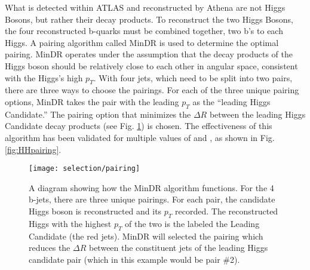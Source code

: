         What is detected within ATLAS and reconstructed by Athena are not Higgs Bosons, but rather their decay products.
        To reconstruct the two Higgs Bosons, the four reconstructed b-quarks must be combined together, two b's to each Higgs.
        A pairing algorithm called MinDR\cite{hh4b_2021_int_note}
            is used to determine the optimal pairing.
        MinDR operates under the assumption that the decay products of the Higgs boson
            should be relatively close to each other in angular space, consistent with the Higgs's high $p_T$.
        With four jets, which need to be split into two pairs, there are three ways to choose the pairings.
        For each of the three unique pairing options, MinDR takes the pair with the leading $p_T$ as the ``leading Higgs Candidate.''
        The pairing option that minimizes the $\Delta R$ between the leading Higgs Candidate decay products
            (see Fig. \ref{fig:minDR_pairing_diagram}) is chosen.
        The effectiveness of this algorithm has been validated for multiple values of \kvv and \kl,
            as shown in Fig. \ref{fig:HHpairing}.

        \begin{figure}[tbh]
            \texttt{[image: selection/pairing]}
            \caption{
                A diagram showing how the MinDR algorithm functions.
                For the 4 b-jets, there are three unique pairings.
                For each pair, the candidate Higgs boson is reconstructed and its $p_T$ recorded.
                The reconstructed Higgs with the highest $p_T$ of the two is the labeled the Leading Candidate
                    (the red jets).
                MinDR will selected the pairing which reduces the $\Delta R$ between the constituent jets
                    of the leading Higgs candidate pair (which in this example would be pair \#2)\cite{hh4b_2021_int_note}.
            }
            \label{fig:minDR_pairing_diagram}
        \end{figure}


